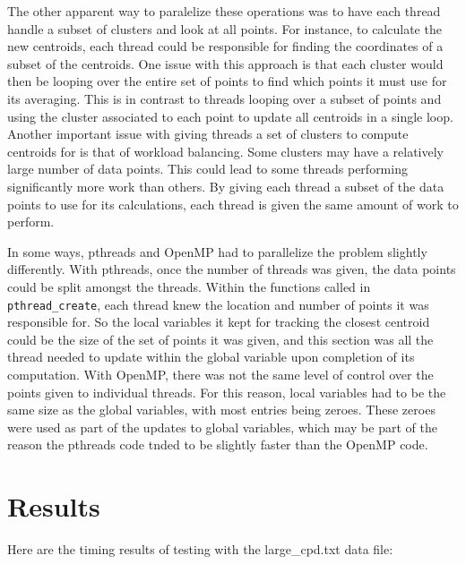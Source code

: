 \documentclass[a4paper]{article}
\begin{document}
The other apparent way to paralelize these operations was to have each thread handle a subset of clusters and look at all points. For instance, to
calculate the new centroids, each thread could be responsible for finding the coordinates of a subset of the centroids. One issue with this approach
is that each cluster would then be looping over the entire set of points to find which points it must use for its averaging. This is in contrast to
threads looping over a subset of points and using the cluster associated to each point to update all centroids in a single loop. Another important
issue with giving threads a set of clusters to compute centroids for is that of workload balancing. Some clusters may have a relatively large number
of data points. This could lead to some threads performing significantly more work than others. By giving each thread a subset of the data points to
use for its calculations, each thread is given the same amount of work to perform.

In some ways, pthreads and OpenMP had to parallelize the problem slightly differently. With pthreads, once the number of threads was given, the data
points could be split amongst the threads. Within the functions called in \texttt{pthread\_create}, each thread knew the location and number of points
it was responsible for. So the local variables it kept for tracking the closest centroid could be the size of the set of points it was given, and this
section was all the thread needed to update within the global variable upon completion of its computation. With OpenMP, there was not the same level
of control over the points given to individual threads. For this reason, local variables had to be the same size as the global variables, with most
entries being zeroes. These zeroes were used as part of the updates to global variables, which may be part of the reason the pthreads code tnded to be
slightly faster than the OpenMP code.

\section{Results}

Here are the timing results of testing with the large\_cpd.txt data file:
\end{document}
